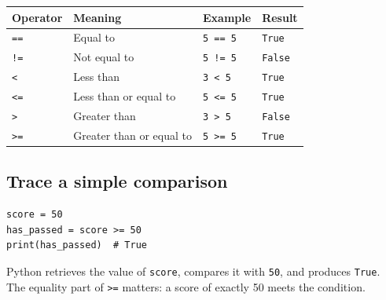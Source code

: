 \documentclass[12pt,a4paper]{article}
\begin{document}
\begingroup\small\renewcommand{\arraystretch}{1.3}\begin{longtable}{>{\raggedright\arraybackslash}p{}>{\raggedright\arraybackslash}p{}>{\raggedright\arraybackslash}p{}>{\raggedright\arraybackslash}p{}}
\toprule
\rowcolor{panel} Operator & Meaning & Example & Result \\ \midrule\endhead
\texttt{==} & Equal to & \texttt{5 == 5} & \texttt{True} \\
\texttt{!=} & Not equal to & \texttt{5 != 5} & \texttt{False} \\
\texttt{<} & Less than & \texttt{3 < 5} & \texttt{True} \\
\texttt{<=} & Less than or equal to & \texttt{5 <= 5} & \texttt{True} \\
\texttt{>} & Greater than & \texttt{3 > 5} & \texttt{False} \\
\texttt{>=} & Greater than or equal to & \texttt{5 >= 5} & \texttt{True} \\
\bottomrule\end{longtable}\endgroup
{}\subsection*{Trace a simple comparison}
\begin{minipage}{\linewidth}
\begin{lstlisting}
score = 50
has_passed = score >= 50
print(has_passed)  # True
\end{lstlisting}
\end{minipage}
\par
Python retrieves the value of \texttt{score}, compares it with \texttt{50}, and produces \texttt{True}. The equality part of \texttt{>=} matters: a score of exactly 50 meets the condition.
\end{document}

